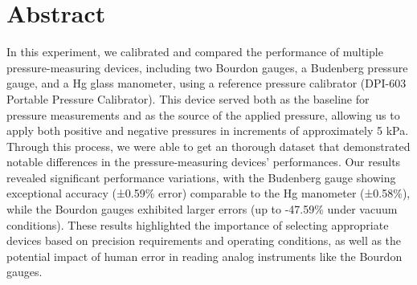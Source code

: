 \documentclass{article}
\newcounter{dataset}
\begin{document}
\section{Abstract}
In this experiment, we calibrated and compared the performance of multiple pressure-measuring devices, including two Bourdon gauges, a Budenberg pressure gauge, and a Hg glass manometer, using a reference pressure calibrator (DPI-603 Portable Pressure Calibrator). This device served both as the baseline for pressure measurements and as the source of the applied pressure, allowing us to apply both positive and negative pressures in increments of approximately 5 kPa. Through this process, we were able to get an thorough dataset that demonstrated notable differences in the pressure-measuring devices' performances. Our results revealed significant performance variations, with the Budenberg gauge showing exceptional accuracy (±0.59\% error) comparable to the Hg manometer (±0.58\%), while the Bourdon gauges exhibited larger errors (up to -47.59\% under vacuum conditions). These results highlighted the importance of selecting appropriate devices based on precision requirements and operating conditions, as well as the potential impact of human error in reading analog instruments like the Bourdon gauges.

	
	\newpage\vspace*{-20pt}
\end{document}
